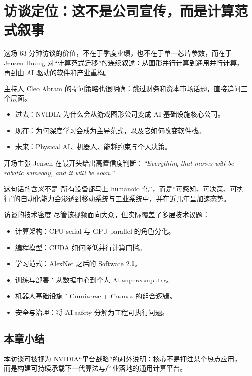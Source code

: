 \section{访谈定位：这不是公司宣传，而是计算范式叙事}

这场 63 分钟访谈的价值，不在于季度业绩，也不在于单一芯片参数，而在于 Jensen Huang 对“计算范式迁移”的连续叙述：从图形并行计算到通用并行计算，再到由 AI 驱动的软件和产业重构。

主持人 Cleo Abram 的提问策略也很明确：跳过财务和资本市场话题，直接追问三个层面。
\begin{itemize}
    \item 过去：NVIDIA 为什么会从游戏图形公司变成 AI 基础设施核心公司。
    \item 现在：为何深度学习会成为主导范式，以及它如何改变软件栈。
    \item 未来：Physical AI、机器人、能耗约束与个人决策。
\end{itemize}

\begin{importantbox}{开场主张}
Jensen 在最开头给出高置信度判断：\textit{``Everything that moves will be robotic someday, and it will be soon.''}

这句话的含义不是“所有设备都马上 humanoid 化”，而是“可感知、可决策、可执行”的自动化能力会渗透到移动系统与工业系统中，并在近几年呈加速态势。
\end{importantbox}

\begin{knowledgebox}{访谈的技术密度}
尽管该视频面向大众，但实际覆盖了多层技术议题：
\begin{itemize}
    \item 计算架构：CPU serial 与 GPU parallel 的角色分化。
    \item 编程模型：CUDA 如何降低并行计算门槛。
    \item 学习范式：AlexNet 之后的 Software 2.0。
    \item 训练与部署：从数据中心到个人 AI supercomputer。
    \item 机器人基础设施：Omniverse + Cosmos 的组合逻辑。
    \item 安全与治理：将 AI safety 分解为工程可执行问题。
\end{itemize}
\end{knowledgebox}

\subsection{本章小结}
本访谈可被视为 NVIDIA“平台战略”的对外说明：核心不是押注某个热点应用，而是构建可持续承载下一代算法与产业落地的通用计算平台。

